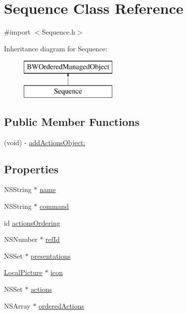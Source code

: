 \hypertarget{interface_sequence}{
\section{Sequence Class Reference}
\label{interface_sequence}
}


{\ttfamily \#import $<$Sequence.h$>$}

Inheritance diagram for Sequence:\begin{figure}[H]
\begin{center}
\leavevmode
\includegraphics[height=2.000000cm]{interface_sequence}
\end{center}
\end{figure}
\subsection*{Public Member Functions}
\begin{DoxyCompactItemize}
\item 
(void) -\/ \hyperlink{interface_sequence_a94cfbe9fb0dab500d4a394ce7cb05e26}{addActionsObject:}
\end{DoxyCompactItemize}
\subsection*{Properties}
\begin{DoxyCompactItemize}
\item 
NSString $\ast$ \hyperlink{interface_sequence_a4b93d352d2fca75b34e1b5a50e03f587}{name}
\item 
NSString $\ast$ \hyperlink{interface_sequence_a2522bcccf0cad2b648b173e46f9ae203}{command}
\item 
id \hyperlink{interface_sequence_a2b094e65700f1a1771c3cf6e901b1b72}{actionsOrdering}
\item 
NSNumber $\ast$ \hyperlink{interface_sequence_ae24e2568d0d3a40bebefe304cb92656c}{refId}
\item 
NSSet $\ast$ \hyperlink{interface_sequence_a65e57b3bfdc709fe646a438154e98d56}{presentations}
\item 
\hyperlink{interface_local_picture}{LocalPicture} $\ast$ \hyperlink{interface_sequence_a21e2c6aa7561358d31fa0a3b1c8b25f2}{icon}
\item 
NSSet $\ast$ \hyperlink{interface_sequence_a91aad29d286610e94de0c4e735ec7d3c}{actions}
\item 
NSArray $\ast$ \hyperlink{interface_sequence_a164cc483425dfdc4ebb3134cbbc211a3}{orderedActions}
\end{DoxyCompactItemize}


